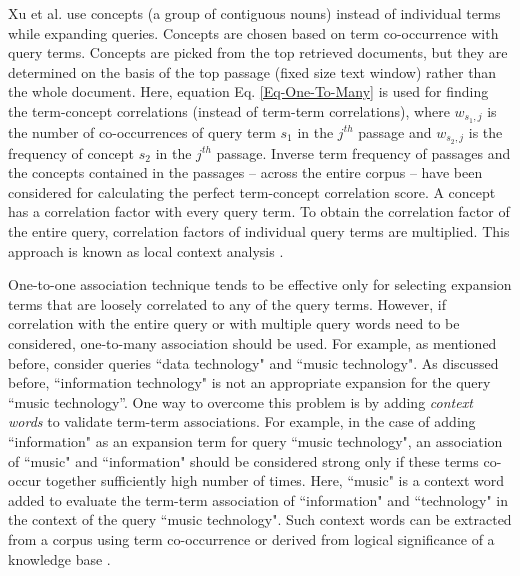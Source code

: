 Xu et al. \cite{xu1996query} use concepts (a group of contiguous nouns) instead of individual terms while expanding queries. Concepts are chosen based on term co-occurrence with query terms. Concepts are picked from the top retrieved documents, but they are determined on the basis of the top passage (fixed size text window) rather than the whole document. Here, equation Eq. \ref{Eq-One-To-Many} is used for finding the term-concept correlations (instead of term-term correlations), where $w_{s_1, j}$ is the number of co-occurrences of query term $s_1$ in the $j^{th}$ passage and $w_{s_2, j}$ is the frequency of concept $s_2$ in the $j^{th}$ passage. Inverse term frequency of passages and the concepts contained in the passages -- across the entire corpus -- have been considered for calculating the perfect term-concept correlation score. A concept has a correlation factor with every query term. To obtain the correlation factor of the entire query, correlation factors of individual query terms are multiplied. This approach is known as local context analysis \cite{xu1996query}.  

One-to-one association technique tends to be effective only for selecting expansion terms that are loosely correlated to any of the query terms. However, if correlation with the entire query or with multiple query words need to be considered, one-to-many association should be used.  For example, as mentioned before, consider queries ``data technology" and ``music technology".  As discussed before, ``information technology" is not an appropriate expansion for the query ``music technology''. One way to overcome this problem is by adding \emph{context words} to validate term-term associations. For example, in the case of adding ``information" as an expansion term for query ``music technology", an association of ``music" and ``information" should be considered strong only if these terms co-occur together sufficiently high number of times. Here, ``music" is a context word added to evaluate the term-term association of ``information" and ``technology" in the context of the query ``music technology". Such context words can be extracted from a corpus using term co-occurrence \cite{bai2006context,bai2007using,wang2008mining,jian2016simple} or derived from logical significance of a knowledge base \cite{lau2004belief,dalton2014entity,lehmann2015dbpedia,de2016knowledge}.         

